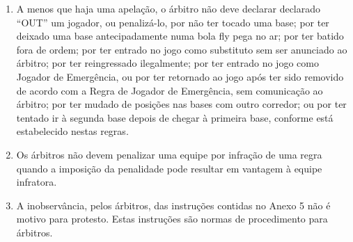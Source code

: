 \begin{multicols}{2}
\begin{enumerate}[label=\alph*)]
		\item  A menos que haja uma apelação, o árbitro não deve declarar declarado “OUT” um jogador, ou penalizá-lo, por não ter tocado uma base; por ter deixado uma base antecipadamente numa bola \gls{fly} pega no ar; por ter batido fora de ordem; por ter entrado no jogo como substituto sem ser anunciado ao árbitro; por ter reingressado ilegalmente; por ter entrado no jogo como Jogador de Emergência, ou por ter retornado ao jogo após ter sido removido de acordo com a Regra de Jogador de Emergência, sem comunicação ao árbitro; por ter mudado de posições nas bases com outro corredor; ou por ter tentado ir à segunda base depois de chegar à primeira base, conforme está estabelecido nestas regras. 
		
		\item  Os árbitros não devem penalizar uma equipe por infração de uma regra quando a imposição da penalidade pode resultar em vantagem à equipe infratora. 
		
		\item  A inobservância, pelos árbitros, das instruções contidas no Anexo 5 não é motivo para protesto. Estas instruções são normas de procedimento para árbitros. 
	\end{enumerate}
\end{multicols}
